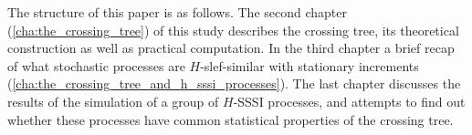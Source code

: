 \documentclass[a4paper,14pt]{extreport}
\begin{document}
The structure of this paper is as follows. The second chapter (\ref{cha:the_crossing_tree})
of this study describes the crossing tree, its theoretical construction as  well as practical
computation. In the third chapter a brief recap of what stochastic processes are $H$-slef-similar
with stationary increments (\ref{cha:the_crossing_tree_and_h_sssi_processes}). The last chapter
discusses the results of the simulation of a group of $H$-SSSI processes, and attempts to
find out whether these processes have common statistical properties of the crossing tree.


\clearpage


\clearpage


\clearpage


\clearpage



\clearpage


% 




\end{document}
